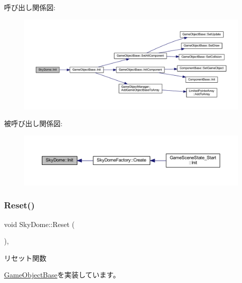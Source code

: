 呼び出し関係図\+:\nopagebreak
\begin{figure}[H]
\begin{center}
\leavevmode
\includegraphics[width=350pt]{class_sky_dome_a948e0e90cea46c78053ac55610812d6c_cgraph}
\end{center}
\end{figure}
被呼び出し関係図\+:\nopagebreak
\begin{figure}[H]
\begin{center}
\leavevmode
\includegraphics[width=350pt]{class_sky_dome_a948e0e90cea46c78053ac55610812d6c_icgraph}
\end{center}
\end{figure}
\mbox{\label{class_sky_dome_abc6f8ed1471d7b03f25924a849cae590}} 
\subsubsection{\texorpdfstring{Reset()}{Reset()}}
{\footnotesize\ttfamily void Sky\+Dome\+::\+Reset (\begin{DoxyParamCaption}{ }\end{DoxyParamCaption})\hspace{0.3cm}{\ttfamily [override]}, {\ttfamily [virtual]}}



リセット関数 



\mbox{\hyperlink{class_game_object_base_a85c59554f734bcb09f1a1e18d9517dce}{Game\+Object\+Base}}を実装しています。



